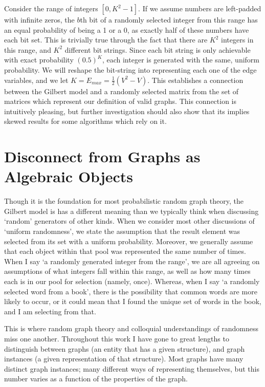 \documentclass[11pt,a4paper]{report}
\begin{document}
Consider the range of integers $[0, K^2 - 1]$.
If we assume numbers are left-padded with infinite zeros, the $b$th bit of a randomly selected integer from this range has an equal probability of being a 1 or a 0, as exactly half of these numbers have each bit set.
This is trivially true through the fact that there are $K^2$ integers in this range, and $K^2$ different bit strings.
Since each bit string is only achievable with exact probability $(0.5)^K$, each integer is generated with the same, uniform probability.
We will reshape the bit-string into representing each one of the edge variables, and we let $K = E_{max} = \frac{1}{2}(V^2 - V)$.
This establishes a connection between the Gilbert model and a randomly selected matrix from the set of matrices which represent our definition of valid graphs. 
This connection is intuitively pleasing, but further investigation should also show that its implies skewed results for some algorithms which rely on it.

\section{Disconnect from Graphs as Algebraic Objects}

Though it is the foundation for most probabilistic random graph theory, the Gilbert model is has a different meaning than we typically think when discussing `random' generators of other kinds.
When we consider most other discussions of `uniform randomness', we state the assumption that the result element was selected from its set with a uniform probability.
Moreover, we generally assume that each object within that pool was represented the same number of times.
When I say `a randomly generated integer from the range', we are all agreeing on assumptions of what integers fall within this range, as well as how many times each is in our pool for selection (namely, once). 
Whereas, when I say `a randomly selected word from a book', there is the possibility that common words are more likely to occur, or it could mean that I found the unique set of words in the book, and I am selecting from that.

This is where random graph theory and colloquial understandings of randomness miss one another.
Throughout this work I have gone to great lengths to distinguish between graphs (an entity that has a given structure), and graph instances (a given representation of that structure).
Most graphs have many distinct graph instances; many different ways of representing themselves, but this number varies as a function of the properties of the graph.
\end{document}
